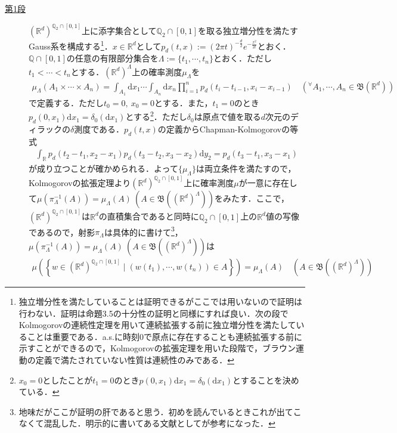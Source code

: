 \documentclass[dvipdfmx]{jsarticle}
\begin{document}
\begin{description}
\item[\underline{第1段}]
$(\mathbb{R}^d)^{\mathbb{Q}_2\cap [0,1]}$上に添字集合として$\mathbb{Q}_2\cap [0,1]$を取る独立増分性を満たすGauss系を構成する\footnote{独立増分性を満たしていることは証明できるがここでは用いないので証明は行わない．証明は\cite{taniguchi}命題3.5の十分性の証明と同様にすれば良い．次の段でKolmogorovの連続性定理を用いて連続拡張する前に独立増分性を満たしていることは重要である．a.s.に時刻0で原点に存在することも連続拡張する前に示すことができるので，Kolmogorovの拡張定理を用いた段階で，ブラウン運動の定義で満たされていない性質は連続性のみである．}．$x\in\mathbb{R}^d$として$p_d(t,x):=(2\pi t)^{-\frac{d}{2}}e^{-\frac{x^2}{2t}}$とおく．$\mathbb{Q}\cap [0,1]$の任意の有限部分集合を$\Lambda:=\{t_1,\cdots,t_n\}$とおく．ただし$t_1<\cdots<t_n$とする．$(\mathbb{R}^d)^\Lambda$上の確率測度$\mu_\Lambda$を
\begin{align*}
\mu_{\Lambda}(A_1\times\cdots\times A_n)=\int_{A_1}\mathrm{d}x_1\cdots\int_{A_n}\mathrm{d}x_n \prod_{i=1}^n p_d(t_i-t_{i-1},x_i-x_{i-1}) \quad ( ^\forall A_1,\cdots,A_n\in\mathfrak{B}(\mathbb{R}^d))
\end{align*}
で定義する．ただし$t_0=0,{\ }x_0=0$とする．また，$t_1=0$のとき$p_d(0,x_1)\mathrm{d}x_1=\delta_0(\mathrm{d}x_1)$とする\footnote{$x_0=0$としたことが$t_1=0$のとき$p(0,x_1)\mathrm{d}x_1=\delta_0(\mathrm{d}x_1)$とすることを決めている．}．ただし$\delta_0$は原点で値を取る$d$次元のディラックの$\delta$測度である．$p_d(t,x)$の定義からChapman-Kolmogorovの等式
\begin{align*}
\int_{\mathbb{R}} p_d(t_2-t_1,x_2-x_1)p_d(t_3-t_2,x_3-x_2)\mathrm{d}y_2=p_d(t_3-t_1,x_3-x_1)
\end{align*}
が成り立つことが確かめられる．よって$\{\mu_\Lambda\}$は両立条件を満たすので，Kolmogorovの拡張定理より$(\mathbb{R}^d)^{\mathbb{Q}_2\cap [0,1]}$上に確率測度$\mu$が一意に存在して$\mu(\pi_\Lambda^{-1}(A))=\mu_\Lambda(A){\ }(A\in\mathfrak{B}((\mathbb{R}^d)^\Lambda))$をみたす．ここで，$(\mathbb{R}^d)^{\mathbb{Q}_2\cap [0,1]}$は$\mathbb{R}^d$の直積集合であると同時に$\mathbb{Q}_2\cap [0,1]$上の$\mathbb{R}^d$値の写像であるので，射影$\pi_\Lambda$は具体的に書けて\footnote{地味だがここが証明の肝であると思う．初め\cite{sugiura}を読んでいるときこれが出てこなくて混乱した．明示的に書いてある文献として\cite{Brady}が参考になった．}，$\mu(\pi_\Lambda^{-1}(A))=\mu_\Lambda(A){\ }(A\in\mathfrak{B}((\mathbb{R}^d)^\Lambda))$は
\begin{align*}
\mu\left(\left\{w\in (\mathbb{R}^d)^{\mathbb{Q}_2\cap [0,1]} \mid (w(t_1),\cdots,w(t_n))\in A\right\}\right)=\mu_\Lambda(A) \quad (A\in\mathfrak{B}((\mathbb{R}^d)^\Lambda))

\end{align*}
\end{description}
\end{document}
